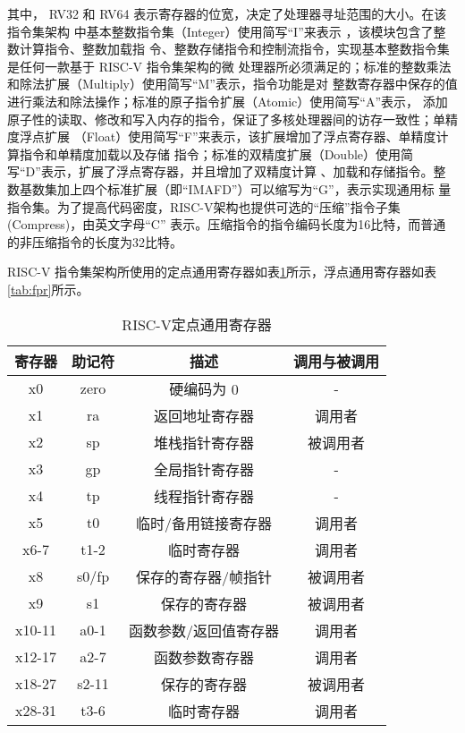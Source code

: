 其中， RV32 和 RV64 表示寄存器的位宽，决定了处理器寻址范围的大小。在该指令集架构
中基本整数指令集（Integer）使用简写“I”来表示 ，该模块包含了整数计算指令、整数加载指
令、整数存储指令和控制流指令，实现基本整数指令集是任何一款基于 RISC-V 指令集架构的微
处理器所必须满足的；标准的整数乘法和除法扩展（Multiply）使用简写“M”表示，指令功能是对
整数寄存器中保存的值进行乘法和除法操作；标准的原子指令扩展（Atomic）使用简写“A”表示，
添加原子性的读取、修改和写入内存的指令，保证了多核处理器间的访存一致性；单精度浮点扩展
（Float）使用简写“F”来表示，该扩展增加了浮点寄存器、单精度计算指令和单精度加载以及存储
指令；标准的双精度扩展（Double）使用简写“D”表示，扩展了浮点寄存器，并且增加了双精度计算
、加载和存储指令。整数基数集加上四个标准扩展（即“IMAFD”）可以缩写为“G”，表示实现通用标
量指令集。为了提高代码密度，RISC-V架构也提供可选的“压缩”指令子集(Compress)，由英文字母“C”
表示。压缩指令的指令编码长度为16比特，而普通的非压缩指令的长度为32比特。


RISC-V 指令集架构所使用的定点通用寄存器如表\ref{tab:xpr}所示，浮点通用寄存器如表\ref{tab:fpr}所示。
\begin{table}[h]
  \centering
  \caption{RISC-V定点通用寄存器}
  \label{tab:xpr}
  \begin{tabular}{cccc}
    \toprule
寄存器 &	助记符	& 描述 &	调用与被调用\\
    \midrule
    x0 & zero & 硬编码为 0 & -\\
    x1 & ra & 返回地址寄存器 & 调用者\\
    x2 & sp & 堆栈指针寄存器 & 被调用者\\
    x3 & gp & 全局指针寄存器 & -\\
    x4 & tp & 线程指针寄存器 & -\\
    x5 & t0 & 临时/备用链接寄存器 & 调用者\\
    x6-7 & t1-2 & 临时寄存器 & 调用者\\
    x8 & s0/fp & 保存的寄存器/帧指针 & 被调用者\\
    x9 & s1 & 保存的寄存器 & 被调用者\\
    x10-11 & a0-1 & 函数参数/返回值寄存器 & 调用者\\
    x12-17 & a2-7 & 函数参数寄存器 & 调用者\\
    x18-27 & s2-11 & 保存的寄存器 & 被调用者\\
    x28-31	& t3-6 & 临时寄存器 & 调用者\\
    \bottomrule
  \end{tabular}
\end{table}


